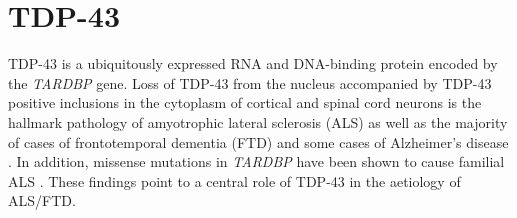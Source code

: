 %
%
%
%



%
%
%
%
%
%
%


\section{TDP-43}
TDP-43 is a ubiquitously expressed RNA and DNA-binding protein encoded by the \emph{TARDBP} gene. Loss of TDP-43 from the nucleus accompanied by TDP-43 positive inclusions in the cytoplasm of cortical and spinal cord neurons is the hallmark pathology of amyotrophic lateral sclerosis (ALS) as well as the majority of  cases of frontotemporal dementia (FTD) \citep{Neumann2006-re} and some cases of Alzheimer's disease \citep{LaClair2016} . In addition, missense mutations in \emph{TARDBP} have been shown to cause familial ALS \citep{Sreedharan2008-xv}. These findings point to a central role of TDP-43 in the aetiology of ALS/FTD. 


